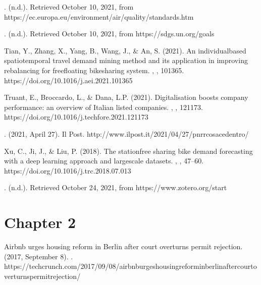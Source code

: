\documentclass[letterpaper,10pt,english]{jupyterBook}
\begin{document}
\sphinxAtStartPar
{}. (n.d.). Retrieved October 10, 2021, from https://ec.europa.eu/environment/air/quality/standards.htm

\sphinxAtStartPar
{}. (n.d.). Retrieved October 10, 2021, from https://sdgs.un.org/goals

\sphinxAtStartPar
Tian, Y., Zhang, X., Yang, B., Wang, J., \& An, S. (2021). An individual\sphinxhyphen{}based spatio\sphinxhyphen{}temporal travel demand mining method and its application in improving rebalancing for free\sphinxhyphen{}floating bike\sphinxhyphen{}sharing system. , , 101365. https://doi.org/10.1016/j.aei.2021.101365

\sphinxAtStartPar
Truant, E., Broccardo, L., \& Dana, L.\sphinxhyphen{}P. (2021). Digitalisation boosts company performance: an overview of Italian listed companies. , , 121173. https://doi.org/10.1016/j.techfore.2021.121173

\sphinxAtStartPar
{}. (2021, April 27). Il Post. http://www.ilpost.it/2021/04/27/pnrr\sphinxhyphen{}cosa\sphinxhyphen{}ce\sphinxhyphen{}dentro/

\sphinxAtStartPar
Xu, C., Ji, J., \& Liu, P. (2018). The station\sphinxhyphen{}free sharing bike demand forecasting with a deep learning approach and large\sphinxhyphen{}scale datasets. , , 47–60. https://doi.org/10.1016/j.trc.2018.07.013

\sphinxAtStartPar
{}. (n.d.). Retrieved October 24, 2021, from https://www.zotero.org/start


\section{Chapter 2}
\label{\detokenize{references:chapter-2}}
\sphinxAtStartPar
Airbnb urges housing reform in Berlin after court overturns permit rejection. (2017, September 8). . https://techcrunch.com/2017/09/08/airbnb\sphinxhyphen{}urges\sphinxhyphen{}housing\sphinxhyphen{}reform\sphinxhyphen{}in\sphinxhyphen{}berlin\sphinxhyphen{}after\sphinxhyphen{}court\sphinxhyphen{}overturns\sphinxhyphen{}permit\sphinxhyphen{}rejection/
\end{document}
